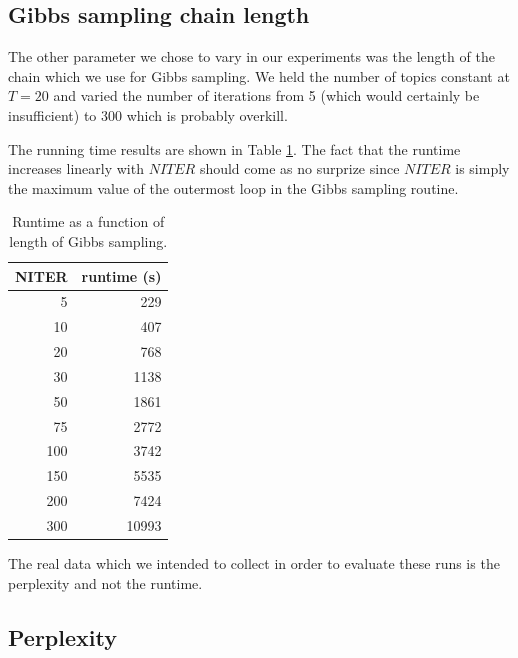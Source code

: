 \documentclass[11pt]{article}
\begin{document}
    \subsection{Gibbs sampling chain length}

        The other parameter we chose to vary in our experiments was the length of
        the chain which we use for Gibbs sampling. 
        We held the number of topics constant at $T=20$ and varied the number
        of iterations from 5 (which would certainly be insufficient) to 300 which
        is probably overkill.

        The running time results are shown in Table \ref{table:runtimeNITER}.
        The fact that the runtime increases linearly with $NITER$ should come
        as no surprize since $NITER$ is simply the maximum value of the outermost loop
        in the Gibbs sampling routine.

        \begin{table}
        \centering
        \caption{Runtime as a function of length of Gibbs sampling.}
        \begin{tabular}{|r r |}
        \hline
        NITER   &   runtime (s) \\
        \hline
               5&         229 \\
              10&         407 \\
              20&         768 \\
              30&        1138 \\
              50&        1861 \\
              75&        2772 \\
             100&        3742 \\
             150&        5535 \\
             200&        7424 \\
             300&       10993 \\
        \hline
        \end{tabular}
        \label{table:runtimeNITER}
        \end{table} 
        
        The real data which we intended to collect in order to evaluate these runs 
        is the perplexity and not the runtime.
        

    \subsection{Perplexity}
\end{document}
